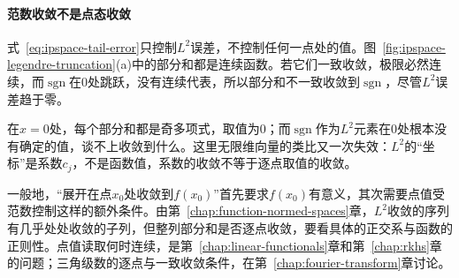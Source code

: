 \paragraph{范数收敛不是点态收敛}
式~\eqref{eq:ipspace-tail-error}只控制$L^2$误差，不控制任何一点处的值。图~\ref{fig:ipspace-legendre-truncation}(a)中的部分和都是连续函数。若它们一致收敛，极限必然连续，而$\operatorname{sgn}$在$0$处跳跃，没有连续代表，所以部分和不一致收敛到$\operatorname{sgn}$，尽管$L^2$误差趋于零。

在$x=0$处，每个部分和都是奇多项式，取值为$0$；而$\operatorname{sgn}$作为$L^2$元素在$0$处根本没有确定的值，谈不上收敛到什么。这里无限维向量的类比又一次失效：$L^2$的“坐标”是系数$c_j$，不是函数值，系数的收敛不等于逐点取值的收敛。

一般地，“展开在点$x_0$处收敛到$f(x_0)$”首先要求$f(x_0)$有意义，其次需要点值受范数控制这样的额外条件。由第~\ref{chap:function-normed-spaces}章，$L^2$收敛的序列有几乎处处收敛的子列，但整列部分和是否逐点收敛，要看具体的正交系与函数的正则性。点值读取何时连续，是第~\ref{chap:linear-functionals}章和第~\ref{chap:rkhs}章的问题；三角级数的逐点与一致收敛条件，在第~\ref{chap:fourier-transform}章讨论。
